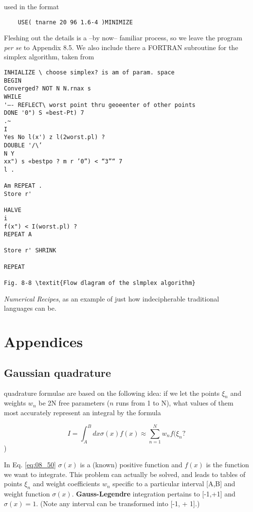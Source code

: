 used in the format

\begin{lstlisting}
    USE( tnarne 20 96 1.6-4 )MINIMIZE
\end{lstlisting}

Fleshing out the details is a --by now-- familiar process, so we leave the program \textit{per se} to Appendix 8.5. We also include there a FORTRAN subroutine for the simplex algorithm, taken from

\begin{lstlisting}
INHIALIZE \ choose simplex? is am of param. space
BEGIN
Converged? NOT N N.rnax s
WHILE
'—- REFLECT\ worst point thru geoeenter of other points
DONE '0") S «best-Pt) 7
.~
I
Yes No l(x') z l(2worst.pl) ?
DOUBLE '/\’
N Y
xx") s «bestpo ? m r ’0”) < “3”“ 7
l .

Am REPEAT .
Store r'

HALVE
i
f(x") < I(worst.pl) ?
REPEAT A

Store r' SHRINK

REPEAT

Fig. 8-8 \textit{Flow dlagram of the slmplex algorithm}
\end{lstlisting}

\textit{Numerical Recipes}, as an example of just how indecipherable traditional languages can be.

\section{Appendices}

\subsection{Gaussian quadrature}

 quadrature formulae are based on the following idea: if we let the points $\xi_{n}$ and weights $w_{n}$ be 2N free parameters ($n$ runs from 1 to N), what values of them most accurately represent an integral by the formula

\begin{equation}\label{eq:08_50}
I = \int_{A}^{B} dx \sigma(x)f(x) \approx \sum_{n=1}^{N} w_{n}f(\xi_{n} ?
\end{equation})

In Eq. \ref{eq:08_50} $\sigma(x)$ is a (known) positive function and $f(x)$ is the function we want to integrate. This problem can actually be solved, and leads to tables of points $\xi_n$ and weight coefficients $w_{n}$ specific to a particular interval [A,B] and weight function $\sigma(x)$. \textbf{Gauss-Legendre} integration pertains to [-1,+1] and $\sigma(x) = 1$. (Note any interval can be transformed into [-1, + 1].)

